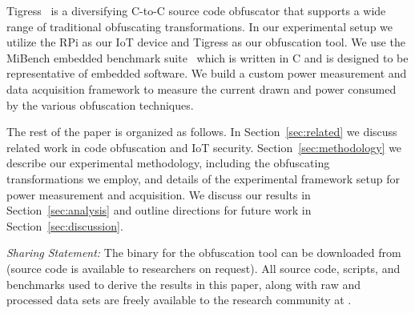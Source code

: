 Tigress~\cite{Collberg2012Distributed,banescu2015framework,banescu2016code} is a diversifying C-to-C source code obfuscator that supports a wide range of traditional obfuscating transformations. In our experimental setup we utilize the RPi as our IoT device and Tigress as our obfuscation tool. We use the MiBench embedded benchmark suite~\cite{990739} which is written in C and is designed to be representative of embedded software. We build a custom power measurement and data acquisition framework to measure the current drawn and power consumed by the various obfuscation techniques.

The rest of the paper is organized as follows. In Section~\ref{sec:related} we discuss related work in code obfuscation and IoT security. Section~\ref{sec:methodology} we describe our experimental methodology, including the obfuscating transformations we employ, and details of the experimental framework setup for power measurement and acquisition. We discuss our results in Section~\ref{sec:analysis} and outline directions for future work in Section~\ref{sec:discussion}.

{\em Sharing Statement:} The binary for the \tigress obfuscation tool can be downloaded from \tigressurl (source code is available to researchers on request). All source code, scripts, and benchmarks used to derive the results in this paper, along with raw and processed data sets are freely available to the research community at \sourceurl. 

\endinput
Several works exist in literature that have analyzed and addressed the impact of security mechanisms (cryptographic algorithms and security protocols) in such devices. \CC{CITATION}   

Both open-source and commercial tools have been used to study the overall affect of obfuscation on energy, efficiency and quality of code. A taxonomy of well established obfuscation techniques was postulated~\cite{collberg1997taxonomy}. Little is studied of the impacts of these obfuscation techniques on resources relative to each other.


